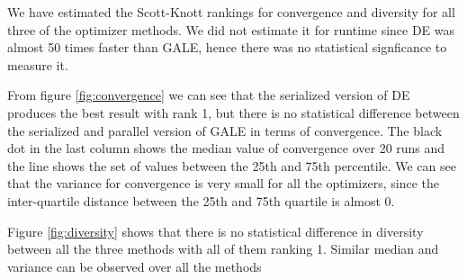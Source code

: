 \documentclass[conference]{IEEEtran}
\begin{document}
We have estimated the Scott-Knott rankings for convergence and diversity for all three of the optimizer methods. We did not estimate it for runtime since DE was almost 50 times faster than GALE, hence there was no statistical signficance to measure it.

From figure \ref{fig:convergence} we can see that the serialized version of DE produces the best result with rank 1, but there is no statistical difference between the serialized and parallel version of GALE in terms of convergence. The black dot in the last column shows the median value of convergence over 20 runs and the line shows the set of values between the 25th and 75th percentile. We can see that the variance for convergence is very small for all the optimizers, since the inter-quartile distance between the 25th and 75th quartile is almost 0.

Figure \ref{fig:diversity} shows that there is no statistical difference in diversity between all the three methods with all of them ranking 1. Similar median and variance can be observed over all the methods



\end{document}

